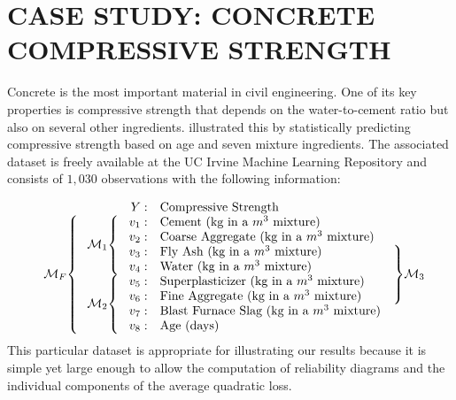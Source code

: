 \documentclass[12pt]{article}
\theoremstyle{definition}
\theoremstyle{definition}
\begin{document}
\section{CASE STUDY: CONCRETE COMPRESSIVE STRENGTH} \label{application}

Concrete is the most important material in civil engineering. One of its key properties is compressive strength that depends on the water-to-cement ratio but also on several other ingredients. \cite{yeh1998modeling} illustrated this by statistically predicting compressive strength based on age and seven mixture ingredients. The associated dataset is freely available at the UC Irvine Machine Learning Repository \citep{Lichman:2013} and consists of $1,030$ observations with the following information:

\begin{equation}
\begin{array}{ll r lr}
&&Y: & \text{Compressive Strength}&\\
\ldelim\{{8}{2.5em}[$\mathcal{M}_F$] &\ldelim\{{4}{2.5em}[$\mathcal{M}_1$] &v_1: &  \text{Cement (kg in a $m^3$ mixture)}&  \\
&&v_2: & \text{Coarse Aggregate (kg in a $m^3$ mixture)}&\\
  &&v_3: &  \text{Fly Ash (kg in a $m^3$ mixture)}&  \rdelim\}{4}{2em}[$\mathcal{M}_3$] \\
&&v_4: & \text{Water (kg in a $m^3$ mixture)}&\\
&\ldelim\{{4}{2.5em}[$\mathcal{M}_2$] &v_5: &  \text{Superplasticizer (kg in a $m^3$ mixture)}&  \\
&&v_6: & \text{Fine Aggregate  (kg in a $m^3$ mixture)}&\\
&&v_7: & \text{Blast Furnace Slag (kg in a $m^3$ mixture)}&\\
&&v_8: & \text{Age (days)}&
\end{array}\label{realData}
\end{equation}
\noindent
This particular dataset is appropriate for illustrating our results because it is simple yet large enough to allow the computation of reliability diagrams and the individual components of the average quadratic loss.
\end{document}
